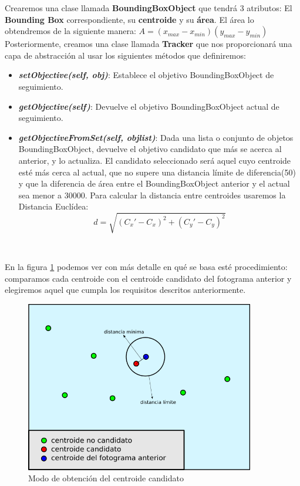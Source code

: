 Crearemos una clase llamada \textbf{BoundingBoxObject} que tendrá 3 atributos: El \textbf{Bounding Box} correspondiente, su \textbf{centroide} y su \textbf{área}. El área lo obtendremos de la siguiente manera: $A = (x_{max} - x_{min}) (y_{max} - y_{min})$\\

Posteriormente, creamos una clase llamada \textbf{Tracker} que nos proporcionará una capa de abstracción al usar los siguientes métodos que definiremos:

\begin{itemize}
	\item \textbf{\textit{setObjective(self, obj)}}: Establece el objetivo BoundingBoxObject de seguimiento.
	\item \textbf{\textit{getObjective(self)}}: Devuelve el objetivo BoundingBoxObject actual de seguimiento.
	\item \textbf{\textit{getObjectiveFromSet(self, objlist)}}: Dada una lista o conjunto de objetos BoundingBoxObject, devuelve el objetivo candidato que más se acerca al anterior, y lo actualiza. El candidato seleccionado será aquel cuyo centroide esté más cerca al actual, que no supere una distancia límite de diferencia(50) y que la diferencia de área entre el BoundingBoxObject anterior y el actual sea menor a 30000. Para calcular la distancia entre centroides usaremos la Distancia Euclídea:
	\begin{equation*}
	d = \sqrt{(C_{x}' - C_{x})^2 + (C_{y}' - C_{y})^2}
	\end{equation*}
\end{itemize}\

En la figura \ref{fig:obtencion_centroide} podemos ver con más detalle en qué se basa esté procedimiento: comparamos cada centroide con el centroide candidato del fotograma anterior y elegiremos aquel que cumpla los requisitos descritos anteriormente.\\

\begin{figure} [H]
  \begin{center}
    \includegraphics[width=10cm]{imagenes/esquema-tracker.png}
  \end{center}
  \caption[Modo de obtención del centroide candidato]{Modo de obtención del centroide candidato}
  \label{fig:obtencion_centroide}
\end{figure}\

